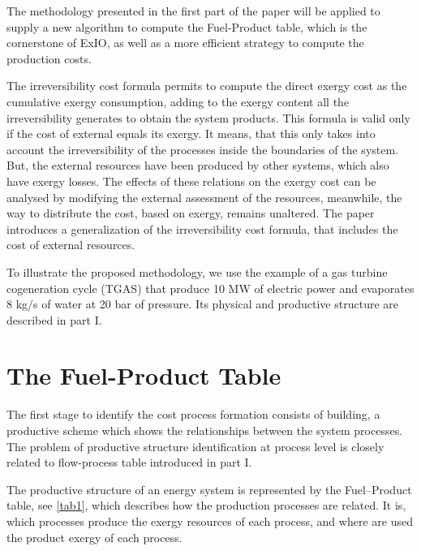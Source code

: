 \documentclass{ecos2018}
\begin{document}
The methodology presented in the first part of the paper will be applied to supply a new algorithm to compute the Fuel-Product table, which is the cornerstone of ExIO, as well as a more efficient strategy to compute the production costs.

The irreversibility cost formula \cite{Torres09} permits to compute the direct exergy cost as the cumulative exergy consumption, adding to the exergy content all the irreversibility generates to obtain the system products. This formula is valid only if the cost of external equals its exergy. It means, that this only takes into account the irreversibility of the processes inside the boundaries of the system. But, the external resources have been produced by other systems, which also have exergy losses. The effects of these relations on the exergy cost can be analysed by modifying the external assessment of the resources, meanwhile, the way to distribute the cost, based on exergy, remains unaltered. The paper introduces a generalization of the irreversibility cost formula, that includes the cost of external resources.

To illustrate the proposed methodology, we use the example of a gas turbine cogeneration cycle (TGAS) that produce 10 MW of electric power and evaporates 8 kg/s of water at 20 bar of pressure. Its physical and productive structure are described in part I.
 
\section{The Fuel-Product Table}
The first stage to identify the cost process formation consists of building, a productive scheme which shows the relationships between the system processes. The problem of productive structure identification at process level is closely related to flow-process table introduced in part I. 

The productive structure of an energy system is represented by the Fuel--Product table, see \cref{tab1}, which describes how the production processes are related. It is, which processes produce the exergy resources of each process, and where are used the product exergy of each process. 
\end{document}
